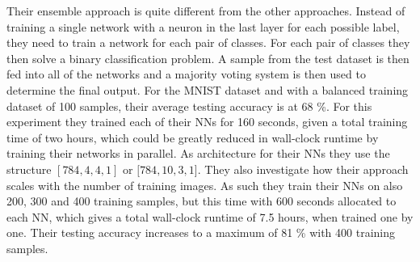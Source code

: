 \noindent Their ensemble approach is quite different from the other approaches. Instead of training a single network with a neuron in the last layer for each possible label, they need to train a network for each pair of classes. For each pair of classes they then solve a binary classification problem. A sample from the test dataset is then fed into all of the networks and a majority voting system is then used to determine the final output. For the MNIST dataset and with a balanced training dataset of 100 samples, their average testing accuracy is at 68 \%. For this experiment they trained each of their NNs for 160 seconds, given a total training time of two hours, which could be greatly reduced in wall-clock runtime by training their networks in parallel.  As architecture for their NNs they use the structure $[784, 4, 4, 1]$ or $[784, 10, 3, 1$]. They also investigate how their approach scales with the number of training images. As such they train their NNs on also 200, 300 and 400 training samples, but this time with 600 seconds allocated to each NN, which gives a total wall-clock runtime of 7.5 hours, when trained one by one. Their testing accuracy increases to a maximum of 81 \% with 400 training samples. \\

\noindent 

